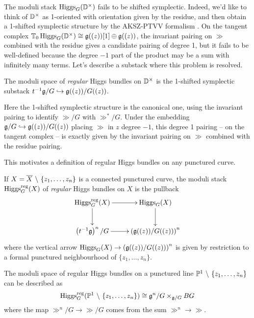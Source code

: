 \documentclass[10pt, oneside, a4paper]{article}
\begin{document}
The moduli stack $\operatorname{Higgs}_G(\mathbb{D}^\times)$ fails to be shifted symplectic.  Indeed, we'd like to think of $\mathbb{D}^\times$ as 1-oriented with orientation given by the residue, and then obtain a 1-shifted symplectic structure by the AKSZ-PTVV formalism \cite[Theorem 2.5]{PTVV}.  On the tangent complex $\mathbb{T}_0 \operatorname{Higgs}_G(\mathbb{D}^\times) \cong \mathfrak{g}((z))[1] \oplus \mathfrak{g}((z))$, the invariant pairing on $\gg$ combined with the residue gives a candidate pairing of degree 1, but it fails to be well-defined because the degree $-1$ part of the product may be a sum with infinitely many terms.  Let's describe a substack where this problem is resolved.

\begin{definition}
 The moduli space of \emph{regular} Higgs bundles on $\mathbb{D}^\times$ is the 1-shifted symplectic substack $t^{-1}\mathfrak{g}/G \hookrightarrow \mathfrak{g}((z))/G((z))$.
\end{definition}

Here the 1-shifted symplectic structure is the canonical one, using the invariant pairing to identify $\gg/G$ with $\gg^*/G$.  Under the embedding $\mathfrak{g}/G \hookrightarrow \mathfrak{g}((z))/G((z))$ placing $\gg$ in $z$ degree $-1$, this degree 1 pairing -- on the tangent complex -- is exactly given by the invariant pairing on $\gg$ combined with the residue pairing.

This motivates a definition of regular Higgs bundles on any punctured curve.
\begin{definition} \label{regular_higgs_def}
If $X = \overline{X} \ \backslash \  \{z_1, \ldots, z_n\}$ is a connected punctured curve, the moduli stack $\operatorname{Higgs}_G^{\mathrm{reg}}(X)$ of \emph{regular} Higgs bundles on $X$ is the pullback
\[\xymatrix{
 \higgs_G^{\mr{reg}}(X) \ar[r] \ar[d] &\higgs_G(X) \ar[d] \\
 \left(t^{-1}\gg\right)^n/G \ar[r] &\left(\gg((z))/G((z))\right)^n
}\]
where the vertical arrow $\operatorname{Higgs}_G(X) \to \left(\mathfrak{g}((z))/G((z))\right)^n$ is given by restriction to a formal punctured neighbourhood of $\{z_1, \ldots, z_n\}$.
\end{definition}

\begin{prop} \label{higgs_bundles_on_punctured_line_prop}
The moduli space of regular Higgs bundles on a punctured line $\mathbb{P}^1 \ \backslash \  \{z_1, \ldots, z_n\}$ can be described as
\[\operatorname{Higgs}_G^{\mathrm{reg}}(\mathbb{P}^1 \ \backslash \  \{z_1, \ldots, z_n\}) \cong \mathfrak{g}^n/G \times_{\mathfrak{g}/G} BG\]
where the map $\gg^n/G \to \gg/G$ comes from the sum $\gg^n \to \gg$.
\end{prop}
\end{document}
